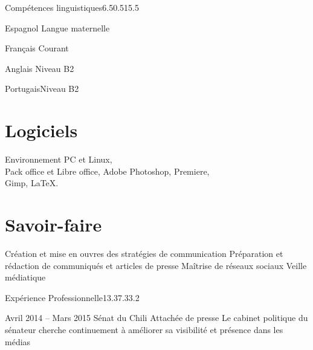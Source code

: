 \documentclass[30pt, french]{tccv}
\begin{document}
\begin{upshape}
\begin{rounded_frame}{Compétences linguistiques}{6.5}{0.5}{15.5}{}
\begin{factlist}
\item{Espagnol} {Langue maternelle}	
\item{Français} {Courant}	
\item{Anglais}  {Niveau B2}	
\item{Portugais}{Niveau B2}
\end{factlist}

\vspace{0.5cm}
\section{Logiciels}
Environnement PC et Linux, \\
Pack office et Libre office,
Adobe Photoshop, Premiere, \\
Gimp,
\LaTeX.

\vspace{0.1cm}
\section{Savoir-faire}
\begin{itemize}[leftmargin=13pt]
  \cvitem[\checkmark]  Création et mise en ouvres des stratégies de communication
  \cvitem[\checkmark]  Préparation et rédaction de communiqués et articles de presse
  \cvitem[\checkmark]  Maîtrise de réseaux sociaux
  \cvitem[\checkmark]  Veille médiatique 
\end{itemize}



\end{rounded_frame}




%
%



\begin{flat_frame}{Expérience Professionnelle}{13.3}{7.3}{3.2}{}
\begin{eventlist}



\setlength{\parskip}{0pt}
\item{\color{text} Avril 2014 -- Mars 2015}
     {Sénat du Chili}
     {Attachée de presse}
     \fontsize{9pt}{1em}\color{text}\bodyfontlight\upshape\selectfont
%
 Le cabinet politique du sénateur  cherche continuement à améliorer sa visibilité et présence dans les médias \\ 


\end{eventlist}
\end{flat_frame}
\end{upshape}
\end{document}
